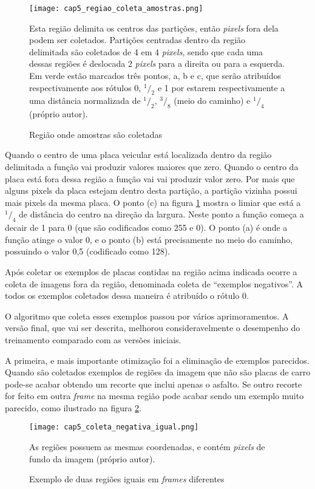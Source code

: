 \begin{figure}[!htb]
	\centering
	\texttt{[image: cap5\_regiao\_coleta\_amostras.png]}
	\caption{Região onde amostras são coletadas}
	\label{fig:cap5_regiao_coleta_amostras}
	Esta região delimita os centros das partições, então \emph{pixels} fora
	dela podem ser coletados. Partições centradas dentro da região delimitada
	são coletados de 4 em 4 \emph{pixels}, sendo que cada uma dessas regiões é
	deslocada 2 \emph{pixels} para a direita ou para a esquerda. Em verde estão
	marcados três pontos, a, b e c, que serão atribuídos respectivamente aos
	rótulos 0, $^1/_2$ e 1 por estarem respectivamente a uma distância
	normalizada de $^1/_2$, $^3/_8$ (meio do caminho) e $^1/_4$
	(próprio autor).
\end{figure}

Quando o centro de uma placa veicular está localizada dentro da região
delimitada a função vai produzir valores maiores que zero. Quando o centro da
placa está fora dessa região a função vai vai produzir valor zero. Por mais que
alguns pixels da placa estejam dentro desta partição, a partição vizinha possui
mais pixels da mesma placa. O ponto
(c) na figura \ref{fig:cap5_regiao_coleta_amostras} mostra o limiar que está
a $^1/_4$ de distância do centro na direção da largura. Neste ponto a função
começa a decair de 1 para 0 (que são codificados como 255 e 0). O ponto (a)
é onde a função atinge o valor 0, e o ponto (b) está precisamente no
meio do caminho, possuindo o valor 0,5 (codificado como 128).

Após coletar os exemplos de placas contidas na região acima indicada ocorre a
coleta de imagens fora da região, denominada coleta de ``exemplos negativos''.
A todos os exemplos coletados dessa maneira é atribuído o rótulo 0.

O algoritmo que coleta esses exemplos passou por vários aprimoramentos. A
versão final, que vai ser descrita, melhorou consideravelmente o desempenho do
treinamento comparado com as versões iniciais.

A primeira, e mais importante otimização foi a eliminação de exemplos
parecidos. Quando são coletados exemplos de regiões da imagem que não são
placas de carro pode-se acabar obtendo um recorte que inclui apenas o asfalto.
Se outro recorte for feito em outra \emph{frame} na mesma região pode acabar
sendo um exemplo muito parecido, como ilustrado na figura
\ref{fig:cap5_coleta_negativa_igual}.

\begin{figure}[!htb]
	\centering
	\texttt{[image: cap5\_coleta\_negativa\_igual.png]}
	\caption{Exemplo de duas regiões iguais em \emph{frames} diferentes}
	\label{fig:cap5_coleta_negativa_igual}
	As regiões possuem as mesmas coordenadas, e contém \emph{pixels} de fundo
	da imagem (próprio autor).
\end{figure}

